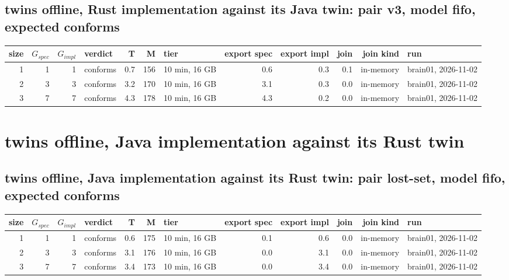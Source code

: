 \documentclass[10pt]{article}
\begin{document}
\subsection*{twins offline, Rust implementation against its Java twin: pair \textsf{v3}, model fifo, expected conforms}
\begin{longtable}{@{}rrrlrrlrrrrl@{}}
\toprule
size & $G_{\mathit{spec}}$ & $G_{\mathit{impl}}$ & verdict & T & M & tier & export spec & export impl & join & join kind & run \\
\midrule
\endhead
\color{red} 1 & 1 & 1 & conforms & 0.7 & 156 & 10 min, 16 GB & 0.6 & 0.3 & 0.1 & in-memory & brain01, 2026-11-02 \\
\color{red} 2 & 3 & 3 & conforms & 3.2 & 170 & 10 min, 16 GB & 3.1 & 0.3 & 0.0 & in-memory & brain01, 2026-11-02 \\
\color{red} 3 & 7 & 7 & conforms & 4.3 & 178 & 10 min, 16 GB & 4.3 & 0.2 & 0.0 & in-memory & brain01, 2026-11-02 \\
\bottomrule
\end{longtable}
\section*{twins offline, Java implementation against its Rust twin}
\subsection*{twins offline, Java implementation against its Rust twin: pair \textsf{lost-set}, model fifo, expected conforms}
\begin{longtable}{@{}rrrlrrlrrrrl@{}}
\toprule
size & $G_{\mathit{spec}}$ & $G_{\mathit{impl}}$ & verdict & T & M & tier & export spec & export impl & join & join kind & run \\
\midrule
\endhead
\color{red} 1 & 1 & 1 & conforms & 0.6 & 175 & 10 min, 16 GB & 0.1 & 0.6 & 0.0 & in-memory & brain01, 2026-11-02 \\
\color{red} 2 & 3 & 3 & conforms & 3.1 & 176 & 10 min, 16 GB & 0.0 & 3.1 & 0.0 & in-memory & brain01, 2026-11-02 \\
\color{red} 3 & 7 & 7 & conforms & 3.4 & 173 & 10 min, 16 GB & 0.0 & 3.4 & 0.0 & in-memory & brain01, 2026-11-02 \\
\bottomrule
\end{longtable}
\end{document}
